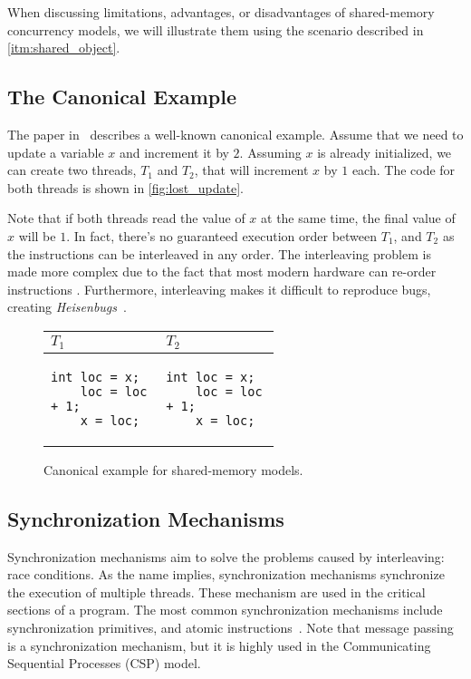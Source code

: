 When discussing limitations, advantages, or disadvantages of shared-memory concurrency models,
we will illustrate them using the scenario described in \autoref{itm:shared_object}.

\subsection{The Canonical Example}

The paper in~\cite{jaffe2011impactOfMemoryModels} describes a well-known canonical example.
Assume that we need to update a variable $x$ and increment it by $2$.
Assuming $x$ is already initialized, we can create two threads, $T_1$ and $T_2$, that will
increment $x$ by $1$ each. The code for both threads is shown in \autoref{fig:lost_update}.

Note that if both threads read the value of $x$ at the same time,
the final value of $x$ will be $1$. In fact, there's no guaranteed execution
order between $T_1$, and $T_2$ as the instructions can be interleaved
in any order. The interleaving problem is made more complex
due to the fact that most modern hardware can re-order instructions
\cite{huang2016debuggingConcurrentPrograms}. Furthermore, interleaving
makes it difficult to reproduce bugs, creating \textit{Heisenbugs}~\cite{rookout2021heisenbug,
gray1986whyComputersStop}.

\begin{figure}[!htp]
    \centering
    \begin{tabular}{|p{0.3\linewidth}|p{0.3\linewidth}|}
        \hline
        \textbf{$T_1$} & \textbf{$T_2$} \\
        \hline
        \begin{Verbatim}[fontsize=\small]
    int loc = x;
    loc = loc + 1;
    x = loc;
        \end{Verbatim}
        &
        \begin{Verbatim}[fontsize=\small]
    int loc = x;
    loc = loc + 1;
    x = loc;
        \end{Verbatim}
        \\
        \hline
    \end{tabular}
    \caption{Canonical example for shared-memory models.}
    \label{fig:lost_update}
\end{figure}

\subsection{Synchronization Mechanisms}
Synchronization mechanisms aim to solve the problems caused by interleaving: race conditions.
As the name implies, synchronization mechanisms synchronize the execution of multiple threads.
These mechanism are used in the critical sections of a program.
The most common synchronization mechanisms include synchronization primitives,
and atomic instructions~\cite{leroy2021sharedMemorySlides}. Note that message passing is a synchronization
mechanism, but it is highly used in the Communicating Sequential Processes (CSP) model.

